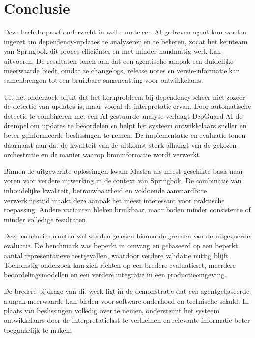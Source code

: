
\chapter{Conclusie}%
\label{ch:conclusie}


Deze bachelorproef onderzocht in welke mate een AI-gedreven agent kan worden ingezet om dependency-updates te analyseren en te beheren, zodat het kernteam van Springbok dit proces efficiënter en met minder handmatig werk kan uitvoeren. De resultaten tonen aan dat een agentische aanpak een duidelijke meerwaarde biedt, omdat ze changelogs, release notes en versie-informatie kan samenbrengen tot een bruikbare samenvatting voor ontwikkelaars.

Uit het onderzoek blijkt dat het kernprobleem bij dependencybeheer niet zozeer de detectie van updates is, maar vooral de interpretatie ervan. Door automatische detectie te combineren met een AI-gestuurde analyse verlaagt DepGuard AI de drempel om updates te beoordelen en helpt het systeem ontwikkelaars sneller en beter geïnformeerde beslissingen te nemen. De implementatie en evaluatie tonen daarnaast aan dat de kwaliteit van de uitkomst sterk afhangt van de gekozen orchestratie en de manier waarop broninformatie wordt verwerkt.

Binnen de uitgewerkte oplossingen kwam Mastra als meest geschikte basis naar voren voor verdere uitwerking in de context van Springbok. De combinatie van inhoudelijke kwaliteit, betrouwbaarheid en voldoende aanvaardbare verwerkingstijd maakt deze aanpak het meest interessant voor praktische toepassing. Andere varianten bleken bruikbaar, maar boden minder consistente of minder volledige resultaten.

Deze conclusies moeten wel worden gelezen binnen de grenzen van de uitgevoerde evaluatie. De benchmark was beperkt in omvang en gebaseerd op een beperkt aantal representatieve testgevallen, waardoor verdere validatie nuttig blijft. Toekomstig onderzoek kan zich richten op een bredere evaluatieset, meerdere beoordelingsmodellen en een verdere integratie in een productieomgeving.

De bredere bijdrage van dit werk ligt in de demonstratie dat een agentgebaseerde aanpak meerwaarde kan bieden voor software-onderhoud en technische schuld. In plaats van beslissingen volledig over te nemen, ondersteunt het systeem ontwikkelaars door de interpretatielast te verkleinen en relevante informatie beter toegankelijk te maken.

\clearpage


